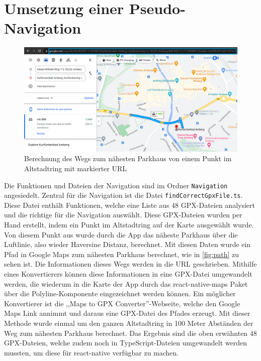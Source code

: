 \chapter{Umsetzung einer Pseudo-Navigation}
\label{chap:5}

\begin{figure}
	\vspace{-\baselineskip}
	\centering
	\includegraphics[scale=0.3]{img/path}
	\caption{Berechnung des Wegs zum nähesten Parkhaus von einem Punkt im Altstadtring mit markierter URL}
	\label{fig:path}
\end{figure}
Die Funktionen und Dateien der Navigation sind im Ordner \verb|Navigation| angesiedelt. Zentral für die Navigation ist die Datei \verb|findCorrectGpxFile.ts|. Diese Datei enthält Funktionen, welche eine Liste aus 48 GPX-Dateien analysiert und die richtige für die Navigation auswählt. Diese GPX-Dateien wurden per Hand erstellt, indem ein Punkt im Altstadtring auf der Karte ausgewählt wurde. Von diesem Punkt aus wurde durch die App das näheste Parkhaus über die Luftlinie, also wieder Haversine Distanz, berechnet. Mit diesen Daten wurde ein Pfad in Google Maps zum nähesten Parkhaus berechnet, wie in \autoref{fig:path} zu sehen ist. Die Informationen dieses Wegs werden in die URL geschrieben. Mithilfe eines Konvertierers können diese Informationen in eine GPX-Datei umgewandelt werden, die wiederum in die Karte der App durch das react-native-maps Paket über die Polyline-Komponente eingezeichnet werden können. Ein möglicher Konvertierer ist die ,,Maps to GPX Converter''-Webseite, welche den Google Maps Link annimmt und daraus eine GPX-Datei des Pfades erzeugt. Mit dieser Methode wurde einmal um den ganzen Altstadtring in 100 Meter Abständen der Weg zum nähesten Parkhaus berechnet. Das Ergebnis sind die oben erwähnten 48 GPX-Dateien, welche zudem noch in TypeScript-Dateien umgewandelt werden mussten, um diese für react-native verfügbar zu machen.


